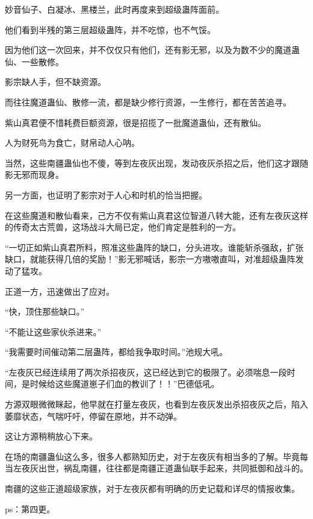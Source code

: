 \begin{this_body}
妙音仙子、白凝冰、黑楼兰，此时再度来到超级蛊阵面前。

他们看到半残的第三层超级蛊阵，并不吃惊，也不气馁。

因为他们这一次回来，并不仅仅只有他们，还有影无邪，以及为数不少的魔道蛊仙、一些散修。

影宗缺人手，但不缺资源。

而往往魔道蛊仙、散修一流，都是缺少修行资源，一生修行，都在苦苦追寻。

紫山真君便不惜耗费巨额资源，很是招揽了一批魔道蛊仙，还有散仙。

人为财死鸟为食亡，财帛动人心呐。

当然，这些南疆蛊仙也不傻，等到左夜灰出现，发动夜灰杀招之后，他们这才跟随影无邪而现身。

另一方面，也证明了影宗对于人心和时机的恰当把握。

在这些魔道和散仙看来，己方不仅有紫山真君这位智道八转大能，还有左夜灰这样的传奇太古荒兽，这场战斗大局已定，他们肯定是胜利的一方。

“一切正如紫山真君所料，照准这些蛊阵的缺口，分头进攻。谁能斩杀强敌，扩张缺口，就能获得几倍的奖励！”影无邪喊话，影宗一方嗷嗷直叫，对准超级蛊阵发动了猛攻。

正道一方，迅速做出了应对。

“快，顶住那些缺口。”

“不能让这些家伙杀进来。”

“我需要时间催动第二层蛊阵，都给我争取时间。”池规大吼。

“左夜灰已经连续用了两次杀招夜灰，这已经达到它的极限了。必须喘息一段时间，是时候给这些魔道崽子们血的教训了！！”巴德低吼。

方源双眼微微眯起，他早就在打量左夜灰，也看到左夜灰发出杀招夜灰之后，陷入萎靡状态，气喘吁吁，停留在原地，并不动弹。

这让方源稍稍放心下来。

在场的南疆蛊仙这么多，很多人都熟知历史，对于左夜灰有相当多的了解。毕竟每当左夜灰出世，祸乱南疆，往往都是南疆正道蛊仙联手起来，共同抵御和战斗的。

南疆的这些正道超级家族，对于左夜灰都有明确的历史记载和详尽的情报收集。

ps：第四更。

\end{this_body}

